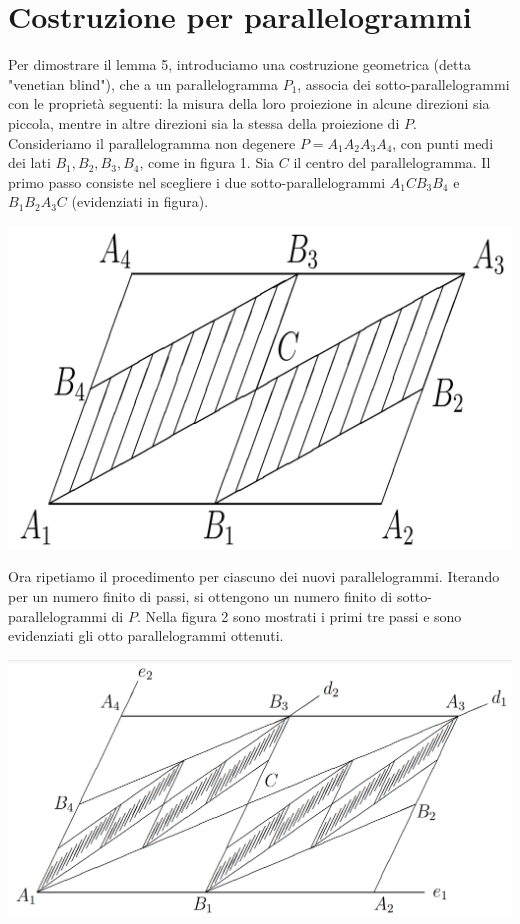 \documentclass[a4paper, twoside,openright]{article}
\newcommand{\<}{\langle}
\renewcommand{\>}{\rangle}
\begin{document}
\newpage

\section{Costruzione per parallelogrammi}

Per dimostrare il lemma 5, introduciamo una costruzione geometrica (detta "venetian blind"), che a un parallelogramma $P_1$, associa dei sotto-parallelogrammi con le proprietà seguenti: la misura della loro proiezione in alcune direzioni sia piccola, mentre in altre direzioni sia la stessa della proiezione di $P$.\\
Consideriamo il parallelogramma non degenere $P=A_{1} A_{2} A_{3} A_{4}$, con punti medi dei lati $B_{1}, B_{2}, B_{3}, B_{4}$, come in figura 1. Sia $C$ il centro del parallelogramma. Il primo passo consiste nel scegliere i due sotto-parallelogrammi $A_{1} C B_{3} B_{4}$ e $B_{1} B_{2} A_{3} C$ (evidenziati in figura).

\begin{center}
	\includegraphics[width=0.5\columnwidth]{passo1.png}
\end{center}

Ora ripetiamo il procedimento per ciascuno dei nuovi parallelogrammi. Iterando per un numero finito di passi, si ottengono un numero finito di sotto-parallelogrammi di $P$. Nella figura 2 sono mostrati i primi tre passi e sono evidenziati gli otto parallelogrammi ottenuti.\\

\begin{center}
	\includegraphics[width=0.7\columnwidth]{passi123.png}
\end{center}
\end{document}
